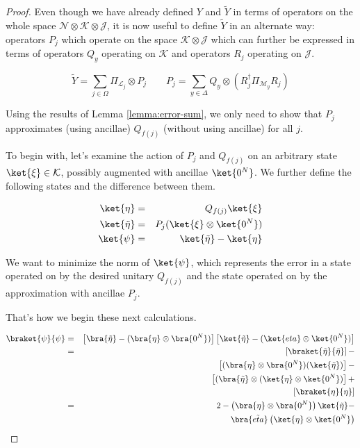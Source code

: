 \begin{proof}
Even though we have already defined $Y$ and $\tilde{Y}$ in terms of
operators on the whole space
$\mathcal{N} \otimes \mathcal{K} \otimes \mathcal{J}$, it is now useful to
define $\tilde{Y}$ in an alternate way: operators $P_j$ which operate on the
space $\mathcal{K} \otimes \mathcal{J}$ which can further be expressed
in terms of operators $Q_y$ operating on $\mathcal{K}$ and operators
$R_j$ operating on $\mathcal{J}$.

\begin{equation}
\tilde{Y} = \sum_{j \in \Omega} \Pi_{\mathcal{L}_j} \otimes P_j \qquad
P_j = \sum_{y \in \Delta} Q_y \otimes (R_j^{\dagger}\Pi_{\mathcal{M}_y}R_j)
\end{equation}

Using the results of Lemma \ref{lemma:error-sum}, we only need to show that
$P_j$ approximates (using ancillae) $Q_{f(j)}$ (without using ancillae) for
all $j$.

To begin with, let's examine the action of $P_j$ and $Q_{f(j)}$ on
an arbitrary state $\ket{\xi} \in \mathcal{K}$, possibly augmented with
ancillae $\ket{0^N}$.
We further define the following states and the difference between them.

\begin{eqnarray}
\ket{\eta}         & = & Q_{f(j)} \ket{\xi} \\
\ket{\tilde{\eta}} & = & P_j(\ket{\xi} \otimes \ket{0^N}) \\
\ket{\psi}         & = & \ket{\tilde{\eta}} - \ket{\eta}
\end{eqnarray}

We want to minimize the norm of $\ket{\psi}$, which represents the error
in a state operated on by the desired unitary $Q_{f(j)}$ and the state
operated on by the approximation with ancillae $P_j$.

That's how we begin these next calculations.

\begin{eqnarray}
\braket{\psi}{\psi} & = & \left[ \bra{\tilde{\eta}} - (\bra{\eta} \otimes \bra{0^N}) \right]
                    \left[ \ket{\tilde{\eta}} - (\ket{eta} \otimes \ket{0^N}) \right] \\
              & = & \left[ \braket{\tilde{\eta}}{\tilde{\eta}} \right ] - \\
              &   & \left[ (\bra{\eta} \otimes \bra{0^N})(\ket{\tilde{\eta}}) \right] - \\
              &   & \left[ (\bra{\tilde{\eta}} \otimes (\ket{\eta} \otimes \ket{0^N}) \right] + \\
              &   & \left[ \braket{\eta}{\eta} \right] \\
              & = & 2 - \left(\bra{\eta} \otimes \bra{0^N} \right) \ket{\tilde{\eta}} - \\
              &   & \bra{\tilde{eta}} \left( \ket{\eta} \otimes \ket{0^N} \right)
\end{eqnarray}


\end{proof}
